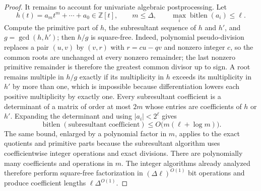 \documentclass{article}
\begin{document}
\begin{proof}
It remains to account for univariate algebraic postprocessing.  Let
\[
h(t)=a_mt^m+\cdots+a_0\in\mathbb Z[t],
\qquad m\le\Delta,
\qquad \max_i\operatorname{bitlen}(a_i)\le\ell.
\tag{15}
\]
Compute the primitive part of \(h\), the subresultant sequence of \(h\) and \(h'\), and \(g=\gcd(h,h')\); then \(h/g\) is square-free.  Indeed, polynomial pseudo-division replaces a pair \((u,v)\) by \((v,r)\) with \(r=c u-qv\) and nonzero integer \(c\), so the common roots are unchanged at every nonzero remainder; the last nonzero primitive remainder is therefore the greatest common divisor up to sign.  A root remains multiple in \(h/g\) exactly if its multiplicity in \(h\) exceeds its multiplicity in \(h'\) by more than one, which is impossible because differentiation lowers each positive multiplicity by exactly one.  Every subresultant coefficient is a determinant of a matrix of order at most \(2m\) whose entries are coefficients of \(h\) or \(h'\).  Expanding the determinant and using \(|a_i|<2^\ell\) gives
\[
\operatorname{bitlen}(\text{subresultant coefficient})
\le O\bigl(m(\ell+\log m)\bigr).
\tag{16}
\]
The same bound, enlarged by a polynomial factor in \(m\), applies to the exact quotients and primitive parts because the subresultant algorithm uses coefficientwise integer operations and exact divisions.  There are polynomially many coefficients and operations in \(m\).  The integer algorithms already analyzed therefore perform square-free factorization in \((\Delta\ell)^{O(1)}\) bit operations and produce coefficient lengths \(\ell\Delta^{O(1)}\).


\end{proof}
\end{document}
